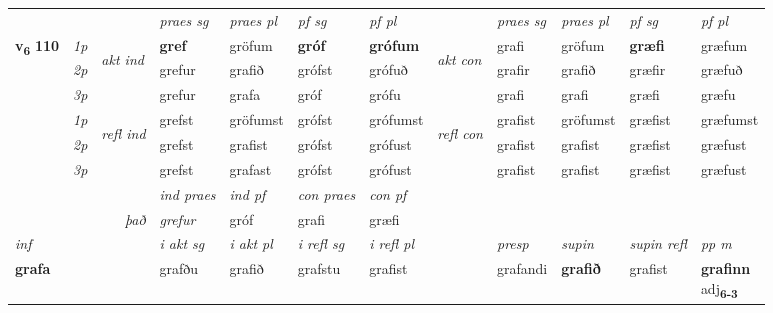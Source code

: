\begin{longtable}[l]{X>{\footnotesize\itshape}llXXXXlXXXX}
\midrule

 & &   & \textit{praes sg}  & \textit{praes pl}    & \textit{ pf sg} & \textit{pf pl} & & \textit{praes sg}  & \textit{praes pl}    & \textit{pf sg} & \textit{pf pl }  \\ \cmidrule{4-7} \cmidrule{9-12}
 \multirow{2}{*}{{{\textbf{v{\textsubscript{6}}} \Large{\textbf{110}}}}}  & 1p & \multirow{3}{*}{\begin{turn}{90}\textit{akt ind}\end{turn}} & \textbf{gref} & gröfum & \textbf{gróf} & \textbf{grófum} & \multirow{3}{*}{\begin{turn}{90}\textit{akt con}\end{turn}} &grafi & gröfum & \textbf{græfi} & græfum\\*
 & 2p &  &  grefur  & grafið & grófst & grófuð & & grafir & grafið & græfir & græfuð \\*
 & 3p &  & grefur & grafa & gróf & grófu & & grafi & grafi& græfi & græfu \\*
\cmidrule{4-7} \cmidrule{9-12}
 & 1p & \multirow{3}{*}{\begin{turn}{90}\textit{refl ind}\end{turn}}  & grefst & gröfumst & grófst & grófumst & \multirow{3}{*}{\begin{turn}{90}\textit{refl con}\end{turn}}  &grafist & gröfumst & græfist & græfumst \\*
 & 2p &  & grefst & grafist & grófst & grófust & &grafist & grafist & græfist & græfust \\*
 & 3p  & & grefst & grafast & grófst & grófust & & grafist & grafist& græfist & græfust \\*
\cmidrule{4-7} \cmidrule{9-12}

   && &  \textit{ind praes} & \textit{ind pf} & \textit{con praes} & \textit{con pf} \\*
\multicolumn{3}{r}{\textit{það}} & grefur & gróf & grafi & græfi \\*

\cmidrule{4-7}
   {\textit{inf}} & &  & \textit{i akt sg} & \textit{i akt pl} & \textit{i refl sg} & \textit{i refl pl} && \textit{presp} & \textit{supin} & \textit{supin refl} & \textit{pp m} \\*
  {\textbf{grafa}} & && grafðu  & grafið & grafstu & grafist && grafandi &  \textbf{grafið} & grafist & \specialcell{\textbf{grafinn} \\ adj\textbf{\textsubscript{6-3}}} \\*


\end{longtable}
